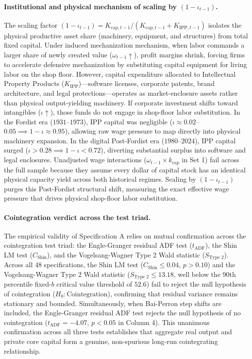 \paragraph{Institutional and physical mechanism of scaling by $(1-\iota_{t-1})$.}
The scaling factor $(1-\iota_{t-1}) = K_{\text{cap},t-1} / (K_{\text{cap},t-1} + K_{\text{IPP},t-1})$ isolates the physical productive asset share (machinery, equipment, and structures) from total fixed capital. Under induced mechanization mechanism, when labor commands a larger share of newly created value ($\omega_{t-1} \uparrow$), profit margins shrink, forcing firms to accelerate defensive mechanization by substituting capital equipment for living labor on the shop floor. However, capital expenditure allocated to Intellectual Property Products ($K_{\text{IPP}}$)---software licenses, corporate patents, brand architecture, and legal protections---operates as market-enclosure assets rather than physical output-yielding machinery. If corporate investment shifts toward intangibles ($\iota \uparrow$), those funds do not engage in shop-floor labor substitution. In the Fordist era ($1931$--$1973$), IPP capital was negligible ($\iota \approx 0.02$--$0.05 \implies 1-\iota \approx 0.95$), allowing raw wage pressure to map directly into physical machinery expansion. In the digital Post-Fordist era ($1980$--$2024$), IPP capital surged ($\iota > 0.28 \implies 1-\iota < 0.72$), diverting substantial surplus into software and legal enclosures. Unadjusted wage interactions ($\omega_{t-1} \times k_{\text{cap}}$ in Set 1) fail across the full sample because they assume every dollar of capital stock has an identical physical capacity yield across both historical regimes. Scaling by $(1-\iota_{t-1})$ purges this Post-Fordist structural shift, measuring the exact effective wage pressure that drives physical shop-floor labor substitution.

\paragraph{Cointegration verdict across the test triad.}
The empirical validity of Specification A relies on mutual confirmation across the cointegration test triad: the Engle-Granger residual ADF test ($t_{\text{ADF}}$), the Shin \citeyearpar{Shin1994} LM test ($C_{\text{Shin}}$), and the Vogelsang-Wagner Type 2 Wald statistic ($S_{\text{Type 2}}$). Across all 48 specifications, the Shin LM test ($C_{\text{Shin}} \le 0.04$, $p > 0.10$) and the Vogelsang-Wagner Type 2 Wald statistic ($S_{\text{Type 2}} \le 13.18$, well below the 90th percentile fixed-$b$ critical value threshold of $52.6$) fail to reject the null hypothesis of cointegration ($H_0: \text{Cointegration}$), confirming that residual variance remains stationary and bounded. Simultaneously, when Bai-Perron step shifts are included, the Engle-Granger residual ADF test rejects the null hypothesis of no cointegration ($t_{\text{ADF}} = -4.07$, $p < 0.05$ in Column 4). This unanimous confirmation across all three tests establishes that aggregate real output and private core capital form a genuine, non-spurious long-run cointegrating relationship.

